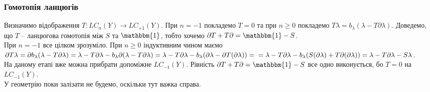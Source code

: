 \documentclass[a4paper, 10pt]{article}
\theoremstyle{theoremdd}
\theoremstyle{theoremdd}
\theoremstyle{theoremdd}
\theoremstyle{theoremdd}
\theoremstyle{theoremdd}
\theoremstyle{theoremdd}
\theoremstyle{theoremdd}
\theoremstyle{theoremdd}
\theoremstyle{theoremdd}
\theoremstyle{theoremdd}
\theoremstyle{theoremdd}
\theoremstyle{theoremdd}
\theoremstyle{theoremdd}
\theoremstyle{theoremdd}
\theoremstyle{theoremdd}
\begin{document}
\subsubsection{Гомотопія ланцюгів}
Визначимо відображення $T \colon LC_n(Y) \to LC_{+1}(Y)$. При $n = -1$ покладемо $T = 0$ та при $n \geq 0$ покладемо $T\lambda = b_\lambda(\lambda - T\partial \lambda)$. Доведемо, що $T$ -- ланцюгова гомотопія між $S$ та $\mathbbm{1}$, тобто хочемо $\partial T + T \partial = \mathbbm{1} - S$.\\
При $n = -1$ все цілком зрозуміло. При $n \geq 0$ індуктивним чином маємо\\
$\partial T\lambda = \partial b_\lambda (\lambda - T \partial \lambda) = \lambda - T \partial \lambda - b_\lambda \partial(\lambda - T \partial \lambda) = \lambda - T \partial \lambda - b_\lambda(\partial \lambda - \partial T(\partial \lambda)) = \\ = \lambda - T \partial \lambda - b_\lambda( S(\partial \lambda) + T \partial (\partial \lambda)) = \lambda - T\partial \lambda - S\lambda$.\\
На даному етапі вже можна прибрати допоміжне $LC_{-1}(Y)$. Рівність $\partial T + T \partial = \mathbbm{1} - S$ все одно виконується, бо $T = 0$ на $LC_{-1}(Y)$.\\
У геометрію поки залізати не будемо, оскільки тут важка справа.
\end{document}
